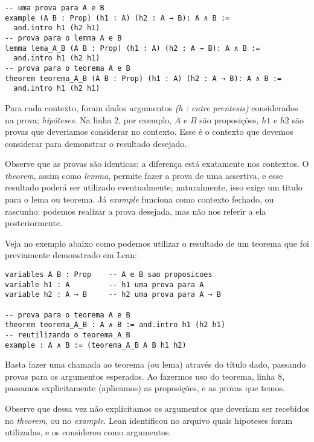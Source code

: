 \vspace{5mm}
\begin{lstlisting}
-- uma prova para A e B
example (A B : Prop) (h1 : A) (h2 : A → B): A ∧ B :=
  and.intro h1 (h2 h1)
-- prova para o lemma A e B
lemma lema_A_B (A B : Prop) (h1 : A) (h2 : A → B): A ∧ B :=
  and.intro h1 (h2 h1)
-- prova para o teorema A e B
theorem teorema_A_B (A B : Prop) (h1 : A) (h2 : A → B): A ∧ B :=
  and.intro h1 (h2 h1)
\end{lstlisting}
\vspace{5mm}

\noindent Para cada contexto, foram dados argumentos \textit{(h : entre prentesis)} considerados na prova; \textit{hipóteses}. Na linha 2, por exemplo, $A$ e $B$ são proposições, $h1$ e $h2$ são provas que deveriamos considerar no contexto. Esse é o contexto que devemos considerar para demonstrar o resultado desejado.

Observe que as provas são identicas; a diferença está exatamente nos contextos. O \textit{theorem}, assim como \textit{lemma}, permite fazer a prova de uma assertiva, e esse resultado poderá ser utilizado eventualmente; naturalmente, isso exige um titulo para o lema ou teorema.
Já \textit{example} funciona como contexto fechado, ou rascunho: podemos realizar a prova desejada, mas não nos referir a ela posteriormente.

Veja no exemplo abaixo como podemos utilizar o resultado de um teorema que foi previamente demonstrado em Lean:

\vspace{5mm}
\begin{lstlisting}
variables A B : Prop    -- A e B sao proposicoes
variable h1 : A         -- h1 uma prova para A
variable h2 : A → B     -- h2 uma prova para A → B

-- prova para o teorema A e B
theorem teorema_A_B : A ∧ B := and.intro h1 (h2 h1)
-- reutilizando o teorema_A_B
example : A ∧ B := (teorema_A_B A B h1 h2)
\end{lstlisting}
\vspace{5mm}

\noindent Basta fazer uma chamada ao teorema (ou lema) através do título dado, passando provas para os argumentos esperados. Ao fazermos uso do teorema, linha 8, passamos explicitamente (aplicamos) as proposições, e as provas que temos.

Observe que dessa vez não explicitamos os argumentos que deveriam ser recebidos no \textit{theorem}, ou no \textit{example}. Lean identificou no arquivo quais hipoteses foram utilizadas, e os considerou como argumentos.


